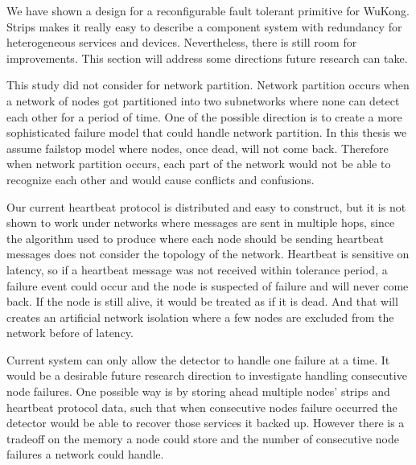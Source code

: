 We have shown a design for a reconfigurable fault tolerant primitive for WuKong.
Strips makes it really easy to describe a component system with redundancy for
heterogeneous services and devices. Nevertheless, there is still room for
improvements. This section will address some directions future research can take.

This study did not consider for network partition. Network
partition occurs when a network of nodes got partitioned into two subnetworks where
none can detect each other for a period of time. One of the possible direction
is to create a more sophisticated failure model that could handle network partition.
In this thesis we assume failstop model where nodes, once dead, will not come
back. Therefore when network partition occurs, each part of the network would
not be able to recognize each other and would cause conflicts and confusions.

Our current heartbeat protocol is distributed and easy to construct, but it is
not shown to work under networks where messages are sent in multiple hops, since
the algorithm used to produce where each node should be sending heartbeat
messages does not consider the topology of the network. Heartbeat is sensitive
on latency, so if a heartbeat message was not received within tolerance period,
a failure event could occur and the node is suspected of failure and will
never come back. If the node is still alive, it would be treated as if it is
dead. And that will creates an artificial network isolation where a few nodes
are excluded from the network before of latency.

Current system can only allow the detector to handle one failure at a time. It
would be a desirable future research direction to investigate handling
consecutive node failures. One possible way is by storing ahead multiple nodes'
strips and heartbeat protocol data, such that when consecutive nodes failure
occurred the detector would be able to recover those services it backed up.
However there is a tradeoff on the memory a node could store and the number of
consecutive node failures a network could handle.

